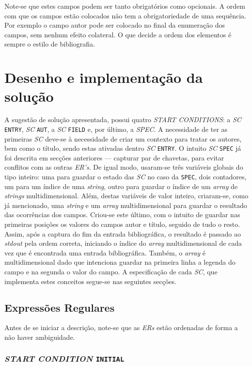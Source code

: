 Note-se que estes campos podem ser tanto obrigatórios como opcionais.
A ordem com que os campos estão colocados não tem a obrigatoriedade de uma
sequência. Por exemplo o campo autor pode ser colocado no final da enumeração
dos campos, sem nenhum efeito colateral. O que decide a ordem dos elementos
é sempre o estilo de bibliografia.


\section{Desenho e implementação da solução}
\label{sec:des:b2}

A sugestão de solução apresentada, possui quatro \emph{START CONDITIONS}:
a \emph{SC} \texttt{ENTRY}, \emph{SC} \texttt{AUT}, a \emph{SC} \texttt{FIELD}
e, por último, a \emph{SPEC}. A necessidade de ter as primeiras \emph{SC}
deve-se à necessidade de criar um contexto para tratar os autores, bem como
o título, sendo estas ativadas dentro \emph{SC} \texttt{ENTRY}. O intuito
\emph{SC} \texttt{SPEC} já foi descrita em secções anteriores --- capturar par
de chavetas, para evitar conflitos com as outras \emph{ER's}. De igual modo,
usaram-se três variáveis globais do tipo inteiro: uma para guardar o estado das
\emph{SC} no caso da \texttt{SPEC}, dois contadores, um para um índice de uma
\emph{string}, outro para guardar o índice de um \emph{array} de \emph{strings}
multidimensional. Além, destas variáveis de valor inteiro, criaram-se, como já
mencionado, uma \emph{string} e um \emph{array} multidimensional para guardar
o resultado das ocorrências dos campos. Criou-se este último, com o intuito de
guardar nas primeiras posições os valores do campos autor e título, seguido de
tudo o resto. Assim, após a captura do fim da entrada bibliográfica, o resultado
é passado ao \emph{stdout} pela ordem correta, iniciando o índice do
\emph{array} multidimensional de cada vez que é encontrada uma entrada
bibliográfica. Também, o \emph{array} é multidimensional dado que intenciona
guardar na primeira linha a legenda do campo e na segunda o valor do campo.
A especificação de cada \emph{SC}, que implementa estes conceitos segue-se nas
seguintes secções.

\subsection{Expressões Regulares}
Antes de se iniciar a descrição, note-se que as \emph{ERs} estão ordenadas de
forma a não haver ambiguidade.


\subsubsection{\emph{START CONDITION} \texttt{INITIAL}}

